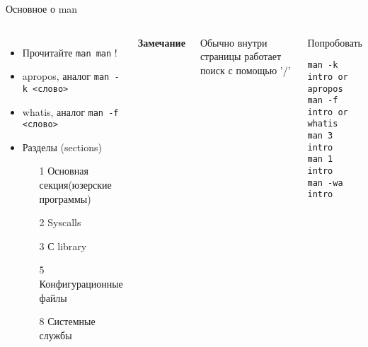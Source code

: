 \begin{frame}[fragile]{Основное о man}
\begin{columns}
	\column{2.5in}
		\begin{itemize}
			\item Прочитайте {\tt man man} !
			\item apropos, аналог {\tt man -k <слово>}
            \item whatis, аналог {\tt man -f <слово>} 
			\item Разделы (sections)
				\begin{itemize}
					\item[1] Основная секция(юзерские программы)
					\item[2] Syscalls
					\item[3] С library
					\item[5] Конфигурационные файлы
					\item[8] Системные службы
				\end{itemize}
		\end{itemize}
	  \textbf{Замечание}

	  Обычно внутри страницы работает поиск с помощью '/'
	\pause 
	
	\column{1in}
		\begin{block}{Попробовать}
			\begin{lstlisting}
man -k intro or apropos
man -f intro or whatis
man 3 intro
man 1 intro
man -wa intro
			\end{lstlisting}
		\end{block}
	\end{columns}
\end{frame}


